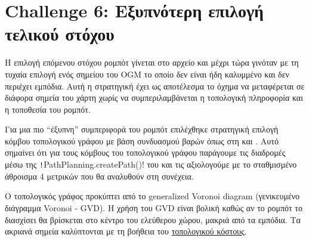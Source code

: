 \section{Challenge 6: Εξυπνότερη επιλογή τελικού στόχου}
Η επιλογή επόμενου στόχου ρομπότ γίνεται στο αρχείο
και μέχρι τώρα γινόταν με τη τυχαία επιλογή ενός σημείου του OGM το οποίο δεν είναι ήδη καλυμμένο και δεν περιέχει εμπόδια.
Αυτή η στρατηγική έχει ως αποτέλεσμα το όχημα να μεταφέρεται σε διάφορα σημεία του χάρτη χωρίς να συμπεριλαμβάνεται η τοπολογική πληροφορία και η τοποθεσία του ρομπότ.

Για μια πιο ``έξυπνη'' συμπεριφορά του ρομπότ επιλέχθηκε στρατηγική επιλογή κόμβου τοπολογικού γράφου με βάση συνδυασμού βαρών
όπως στη \cite{etsardou-phd} και \cite{tsardoulias2016cost}.
Αυτό σημαίνει ότι για τους κόμβους του τοπολογικού γράφου παράγουμε τις διαδρομές μέσω της
\texttt!PathPlanning.createPath()! του
 και τις αξιολογούμε με το σταθμισμένο άθροισμα 4 μετρικών που θα αναλυθούν στη συνέχεια.

Ο τοπολογικός γράφος προκύπτει από το generalized Voronoi diagram (γενικευμένο διάγραμμα Voronoi - GVD).
Η χρήση του GVD είναι βολική καθώς αν το ρομπότ το διασχίσει θα βρίσκεται στο κέντρο του ελεύθερου χώρου, μακριά από τα εμπόδια.
Τα ακριανά σημεία καλύπτονται με τη βοήθεια του \hyperref[section:topo-cost]{τοπολογικού κόστους}.

